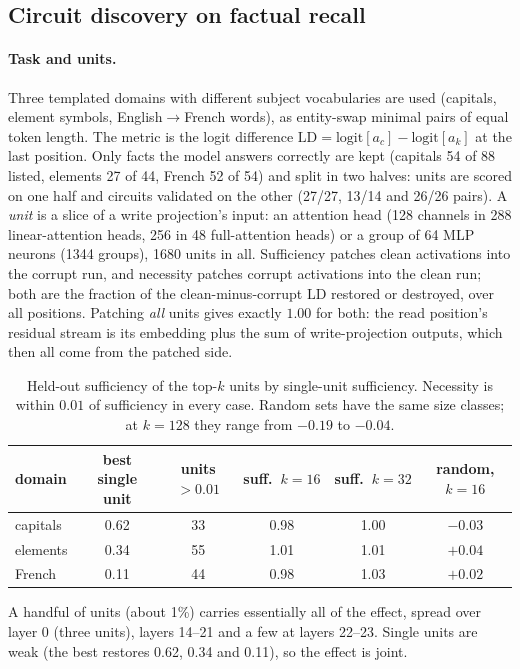 \documentclass[11pt]{article}
\begin{document}
\subsection{Circuit discovery on factual recall}
\paragraph{Task and units.}
Three templated domains with different subject vocabularies are used (capitals, element symbols, English$\to$French words), as entity-swap minimal pairs of equal token
length. The metric is the logit difference $\mathrm{LD}=\mathrm{logit}[a_c]-\mathrm{logit}[a_k]$ at the last position. Only facts the model answers correctly are kept
(capitals 54 of 88 listed, elements 27 of 44, French 52 of 54) and split in two halves: units are scored on one half and circuits validated on the other
(27/27, 13/14 and 26/26 pairs). A \emph{unit} is a slice of a write projection's input: an attention head (128 channels in 288 linear-attention heads, 256 in 48 full-attention heads)
or a group of 64 MLP neurons (1344 groups), 1680 units in all. Sufficiency patches clean activations into the corrupt run, and necessity patches corrupt activations into the clean
run; both are the fraction of the clean-minus-corrupt $\mathrm{LD}$ restored or destroyed, over all positions. Patching \emph{all} units gives exactly $1.00$ for both: the read position's
residual stream is its embedding plus the sum of write-projection outputs, which then all come from the patched side.

\begin{table}[h]
\centering\small
\begin{tabular}{lccccc}
\toprule
domain & best single unit & units $>0.01$ & suff.\ $k{=}16$ & suff.\ $k{=}32$ & random, $k{=}16$\\
\midrule
capitals & 0.62 & 33 & 0.98 & 1.00 & $-0.03$\\
elements & 0.34 & 55 & 1.01 & 1.01 & $+0.04$\\
French   & 0.11 & 44 & 0.98 & 1.03 & $+0.02$\\
\bottomrule
\end{tabular}
\caption{Held-out sufficiency of the top-$k$ units by single-unit sufficiency. Necessity is within $0.01$ of sufficiency in every case. Random sets have the same
size classes; at $k{=}128$ they range from $-0.19$ to $-0.04$.}
\label{tab:circuits}
\end{table}
A handful of units (about 1\%) carries essentially all of the effect, spread over layer 0 (three units), layers 14--21 and a few at layers 22--23. Single units are weak
(the best restores 0.62, 0.34 and 0.11), so the effect is joint.
\end{document}
